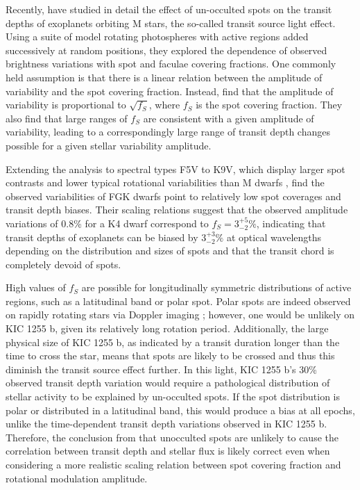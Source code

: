 \documentclass[preprint,trackchanges]{aastex61}
\newcommand{\sha}{KIC 1255 b}
\begin{document}
{Recently, \citet{rackham2018transitSourceEffect} have studied in detail the effect of un-occulted spots on the transit depths of exoplanets orbiting M stars, the so-called transit source light effect.
Using a suite of model rotating photospheres with active regions added successively at random positions, they explored the dependence of observed brightness variations with spot and faculae covering fractions.
One commonly held assumption is that there is a linear relation between the amplitude of variability and the spot covering fraction.
Instead, \citet{rackham2018transitSourceEffect} find that the amplitude of variability is proportional to $\sqrt{f_S}$, where $f_S$ is the spot covering fraction.
They also find that large ranges of $f_{S}$ are consistent with a given amplitude of variability, leading to a correspondingly large range of transit depth changes possible for a given stellar variability amplitude.

Extending the analysis to spectral types F5V to K9V, which display larger spot contrasts \citep{berdyugina2005spots} and lower typical rotational variabilities than M dwarfs \citep{mcquillan2014rotationPeriodsAutoC}, \citet{rackham2018activityFGKsubmitted} find the observed variabilities of FGK dwarfs point to relatively low spot coverages and transit depth biases.
Their scaling relations suggest that the observed amplitude variations of 0.8\% \citep{kawahara2013starspots} for a K4 dwarf correspond to $f_{S}=3^{+5}_{-2}\%$, indicating that transit depths of exoplanets can be biased by $3^{+3}_{-2}\%$ at optical wavelengths depending on the distribution and sizes of spots and that the transit chord is completely devoid of spots.

High values of $f_S$ are possible for longitudinally symmetric distributions of active regions, such as a latitudinal band or polar spot.
Polar spots are indeed observed on rapidly rotating stars via Doppler imaging \citep{strassmeier2009starspots}; however, one would be unlikely on \sha, given its relatively long rotation period.
Additionally, the large physical size of \sha, as indicated by a transit duration longer than the time to cross the star, means that spots are likely to be crossed and thus this diminish the transit source effect further.
In this light, \sha's 30\% observed transit depth variation would require a pathological distribution of stellar activity to be explained by un-occulted spots.
If the spot distribution is polar or distributed in a latitudinal band, this would produce a bias at all epochs, unlike the time-dependent transit depth variations observed in \sha.
Therefore, the conclusion from \citet{croll2015starspots} that unocculted spots are unlikely to cause the correlation between transit depth and stellar flux is likely correct even when considering a more realistic scaling relation between spot covering fraction and rotational modulation amplitude.
}
\end{document}

